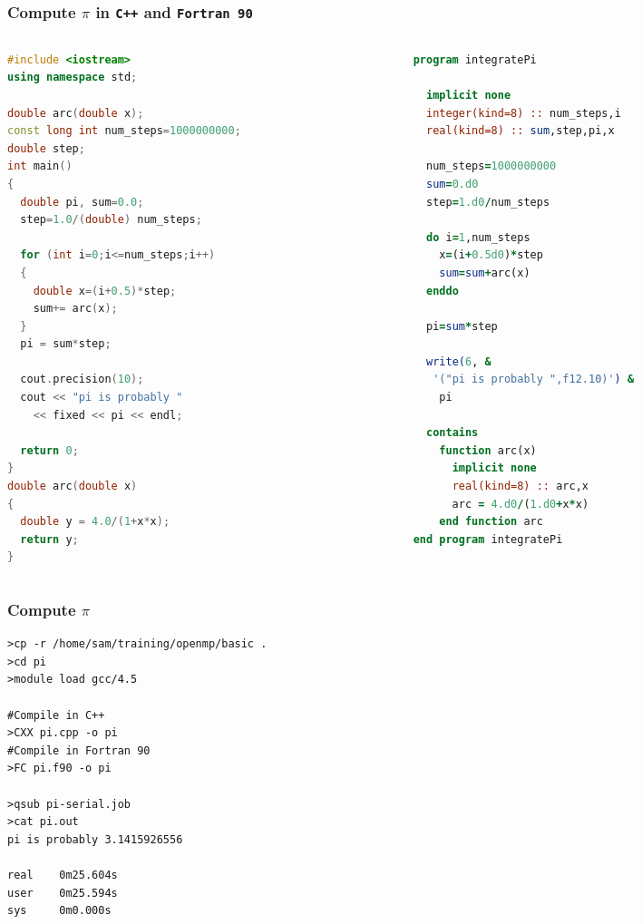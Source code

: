 \documentclass[xcolor=table,10pt,final]{beamer}
\begin{document}
\begin{frame}[fragile]
  \frametitle{Compute $\pi$ in {\tt C++} and {\tt Fortran 90}}
  \begin{columns}[T]
    \begin{column}{0.5\textwidth}
  \begin{lstlisting}[language=C++,basicstyle=\scriptsize]
#include <iostream>
using namespace std;

double arc(double x);
const long int num_steps=1000000000;
double step;
int main()
{
  double pi, sum=0.0;
  step=1.0/(double) num_steps;

  for (int i=0;i<=num_steps;i++)
  {
    double x=(i+0.5)*step;
    sum+= arc(x);
  }
  pi = sum*step;

  cout.precision(10);
  cout << "pi is probably " 
    << fixed << pi << endl;

  return 0;
}
double arc(double x)
{
  double y = 4.0/(1+x*x);
  return y;
}
  \end{lstlisting}
\end{column}
\begin{column}{0.5\textwidth}
  \begin{lstlisting}[language=Fortran,basicstyle=\scriptsize]
program integratePi

  implicit none
  integer(kind=8) :: num_steps,i
  real(kind=8) :: sum,step,pi,x

  num_steps=1000000000
  sum=0.d0
  step=1.d0/num_steps

  do i=1,num_steps
    x=(i+0.5d0)*step
    sum=sum+arc(x)
  enddo

  pi=sum*step

  write(6, &
   '("pi is probably ",f12.10)') &
    pi

  contains
    function arc(x)
      implicit none
      real(kind=8) :: arc,x
      arc = 4.d0/(1.d0+x*x)
    end function arc
end program integratePi
  \end{lstlisting}
\end{column}
\end{columns}
\end{frame}

\begin{frame}[fragile]
  \frametitle{Compute $\pi$}
  \begin{verbatim}
>cp -r /home/sam/training/openmp/basic .
>cd pi
>module load gcc/4.5

#Compile in C++
>CXX pi.cpp -o pi
#Compile in Fortran 90
>FC pi.f90 -o pi

>qsub pi-serial.job
>cat pi.out
pi is probably 3.1415926556

real    0m25.604s
user    0m25.594s
sys     0m0.000s
  \end{verbatim}
\end{frame}
\end{document}

